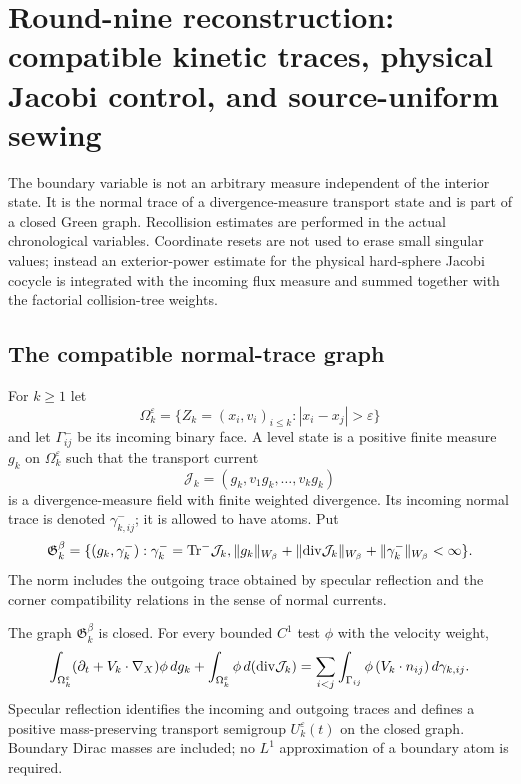 \section{Round-nine reconstruction: compatible kinetic traces, physical Jacobi control, and source-uniform sewing}
\label{sec:r9-b2}

The boundary variable is not an arbitrary measure independent of the interior
state.  It is the normal trace of a divergence-measure transport state and is
part of a closed Green graph.  Recollision estimates are performed in the
actual chronological variables.  Coordinate resets are not used to erase
small singular values; instead an exterior-power estimate for the physical
hard-sphere Jacobi cocycle is integrated with the incoming flux measure and
summed together with the factorial collision-tree weights.

\subsection{The compatible normal-trace graph}

For $k\ge1$ let
\[
 \Omega_k^\varepsilon
 =\{Z_k=(x_i,v_i)_{i\le k}:|x_i-x_j|>\varepsilon\}
\]
and let $\Gamma_{ij}^-$ be its incoming binary face.  A level state is a
positive finite measure $g_k$ on $\Omega_k^\varepsilon$ such that the transport
current
\[
 \mathcal J_k=(g_k,v_1g_k,\ldots,v_kg_k)
\]
is a divergence-measure field with finite weighted divergence.  Its incoming
normal trace is denoted $\gamma^-_{k,ij}$; it is allowed to have atoms.  Put
\[
 \mathfrak G_k^\beta
 =\{(g_k,\gamma_k^-):
   \gamma_k^-={\rm Tr}^-\mathcal J_k,
   \|g_k\|_{W_\beta}+\|{\rm div}\mathcal J_k\|_{W_\beta}
   +\|\gamma_k^-\|_{W_\beta}<\infty\}.
\]
The norm includes the outgoing trace obtained by specular reflection and the
corner compatibility relations in the sense of normal currents.

\begin{theorem}
\label{thm:r9-b2-trace}
The graph $\mathfrak G_k^\beta$ is closed.  For every bounded $C^1$ test
$\phi$ with the velocity weight,
\[
 \int_{\Omega_k^\varepsilon}
  (\partial_t+V_k\cdot\nabla_X)\phi\,dg_k
 +\int_{\Omega_k^\varepsilon}\phi\,d({\rm div}\mathcal J_k)
 =\sum_{i<j}\int_{\Gamma_{ij}}
   \phi\,(V_k\cdot n_{ij})\,d\gamma_{k,ij}.
\]
Specular reflection identifies the incoming and outgoing traces and defines a
positive mass-preserving transport semigroup $U_k^\varepsilon(t)$ on the
closed graph.  Boundary Dirac masses are included; no $L^1$ approximation of
a boundary atom is required.
\end{theorem}

